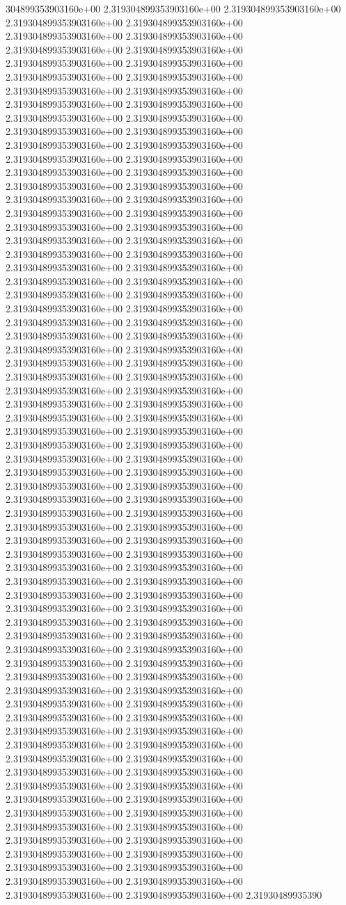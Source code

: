 304899353903160e+00	2.319304899353903160e+00	2.319304899353903160e+00	2.319304899353903160e+00	2.319304899353903160e+00	2.319304899353903160e+00	2.319304899353903160e+00	2.319304899353903160e+00	2.319304899353903160e+00	2.319304899353903160e+00	2.319304899353903160e+00	2.319304899353903160e+00	2.319304899353903160e+00	2.319304899353903160e+00	2.319304899353903160e+00	2.319304899353903160e+00	2.319304899353903160e+00	2.319304899353903160e+00	2.319304899353903160e+00	2.319304899353903160e+00	2.319304899353903160e+00	2.319304899353903160e+00	2.319304899353903160e+00	2.319304899353903160e+00	2.319304899353903160e+00	2.319304899353903160e+00	2.319304899353903160e+00	2.319304899353903160e+00	2.319304899353903160e+00	2.319304899353903160e+00	2.319304899353903160e+00	2.319304899353903160e+00	2.319304899353903160e+00	2.319304899353903160e+00	2.319304899353903160e+00	2.319304899353903160e+00	2.319304899353903160e+00	2.319304899353903160e+00	2.319304899353903160e+00	2.319304899353903160e+00	2.319304899353903160e+00	2.319304899353903160e+00	2.319304899353903160e+00	2.319304899353903160e+00	2.319304899353903160e+00	2.319304899353903160e+00	2.319304899353903160e+00	2.319304899353903160e+00	2.319304899353903160e+00	2.319304899353903160e+00	2.319304899353903160e+00	2.319304899353903160e+00	2.319304899353903160e+00	2.319304899353903160e+00	2.319304899353903160e+00	2.319304899353903160e+00	2.319304899353903160e+00	2.319304899353903160e+00	2.319304899353903160e+00	2.319304899353903160e+00	2.319304899353903160e+00	2.319304899353903160e+00	2.319304899353903160e+00	2.319304899353903160e+00	2.319304899353903160e+00	2.319304899353903160e+00	2.319304899353903160e+00	2.319304899353903160e+00	2.319304899353903160e+00	2.319304899353903160e+00	2.319304899353903160e+00	2.319304899353903160e+00	2.319304899353903160e+00	2.319304899353903160e+00	2.319304899353903160e+00	2.319304899353903160e+00	2.319304899353903160e+00	2.319304899353903160e+00	2.319304899353903160e+00	2.319304899353903160e+00	2.319304899353903160e+00	2.319304899353903160e+00	2.319304899353903160e+00	2.319304899353903160e+00	2.319304899353903160e+00	2.319304899353903160e+00	2.319304899353903160e+00	2.319304899353903160e+00	2.319304899353903160e+00	2.319304899353903160e+00	2.319304899353903160e+00	2.319304899353903160e+00	2.319304899353903160e+00	2.319304899353903160e+00	2.319304899353903160e+00	2.319304899353903160e+00	2.319304899353903160e+00	2.319304899353903160e+00	2.319304899353903160e+00	2.319304899353903160e+00	2.319304899353903160e+00	2.319304899353903160e+00	2.319304899353903160e+00	2.319304899353903160e+00	2.319304899353903160e+00	2.319304899353903160e+00	2.319304899353903160e+00	2.319304899353903160e+00	2.319304899353903160e+00	2.319304899353903160e+00	2.319304899353903160e+00	2.319304899353903160e+00	2.319304899353903160e+00	2.319304899353903160e+00	2.319304899353903160e+00	2.319304899353903160e+00	2.319304899353903160e+00	2.319304899353903160e+00	2.319304899353903160e+00	2.319304899353903160e+00	2.319304899353903160e+00	2.319304899353903160e+00	2.319304899353903160e+00	2.319304899353903160e+00	2.319304899353903160e+00	2.319304899353903160e+00	2.319304899353903160e+00	2.319304899353903160e+00	2.319304899353903160e+00	2.319304899353903160e+00	2.319304899353903160e+00	2.319304899353903160e+00	2.319304899353903160e+00	2.31930489935390